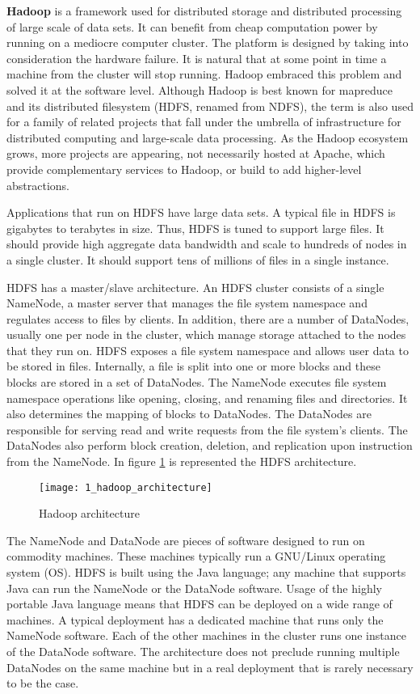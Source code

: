 \textbf{Hadoop} is a framework used for distributed storage and distributed processing of large scale of data sets. It can benefit from cheap computation power by running on a mediocre computer cluster. The platform is designed by taking into consideration the hardware failure. It is natural that at some point in time a machine from the cluster will stop running. Hadoop embraced this problem and solved it at the software level. Although Hadoop is best known for mapreduce and its distributed filesystem (HDFS, renamed from NDFS), the term is also used for a family of related projects that fall under the umbrella of infrastructure for distributed computing and large-scale data processing. As the Hadoop ecosystem grows, more projects are appearing, not necessarily hosted at Apache, which provide complementary services to Hadoop, or build to add higher-level abstractions.

Applications that run on HDFS have large data sets. A typical file in HDFS is gigabytes to terabytes in size. Thus, HDFS is tuned to support large files. It should provide high aggregate data bandwidth and scale to hundreds of nodes in a single cluster. It should support tens of millions of files in a single instance.

HDFS has a master/slave architecture. An HDFS cluster consists of a single NameNode, a master server that manages the file system namespace and regulates access to files by clients. In addition, there are a number of DataNodes, usually one per node in the cluster, which manage storage attached to the nodes that they run on. HDFS exposes a file system namespace and allows user data to be stored in files. Internally, a file is split into one or more blocks and these blocks are stored in a set of DataNodes. The NameNode executes file system namespace operations like opening, closing, and renaming files and directories. It also determines the mapping of blocks to DataNodes. The DataNodes are responsible for serving read and write requests from the file system’s clients. The DataNodes also perform block creation, deletion, and replication upon instruction from the NameNode. In figure \ref{hadoop_architecture} is represented the HDFS architecture.

\begin{figure}[!ht]
\centering
\texttt{[image: 1\_hadoop\_architecture]}
\caption{Hadoop architecture \cite{data_mining_image}}\label{hadoop_architecture}
\end{figure}

The NameNode and DataNode are pieces of software designed to run on commodity machines. These machines typically run a GNU/Linux operating system (OS). HDFS is built using the Java language; any machine that supports Java can run the NameNode or the DataNode software. Usage of the highly portable Java language means that HDFS can be deployed on a wide range of machines. A typical deployment has a dedicated machine that runs only the NameNode software. Each of the other machines in the cluster runs one instance of the DataNode software. The architecture does not preclude running multiple DataNodes on the same machine but in a real deployment that is rarely necessary to be the case.


